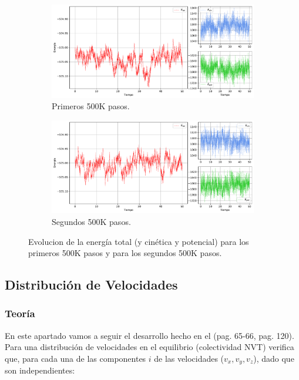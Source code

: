 \documentclass[11pt]{article} %
\begin{document}
\begin{figure}[h!] \centering
\begin{subfigure}{0.45\linewidth} \centering
	\includegraphics[width=1\textwidth]{../../Graficas/Et-equilibra-500K-1.pdf}
	\caption{Primeros 500K pasos.}
	\label{Fig:01}
\end{subfigure}	
\begin{subfigure}{0.45\linewidth}\centering
	\includegraphics[width=1\textwidth]{../../Graficas/Et-equilibra-500K-2.pdf}
	\caption{Segundos 500K pasos.}
	\label{Fig:02}
	\end{subfigure}	
\caption{Evolucion de la energía total (y cinética y potencial) para los primeros 500K pasos y para los segundos 500K pasos.}
\end{figure}


	
\subsection{Distribución de Velocidades}
	
\subsubsection{Teoría}

En este apartado vamos a seguir el desarrollo hecho en el \cite{Haile} (pag. 65-66, pag. 120). Para una distribución de velocidades en el equilibrio (colectividad NVT) verifica que, para cada una de las componentes $i$ de las velocidades ($v_x,v_y,v_z$), dado que son independientes: 
\end{document}
